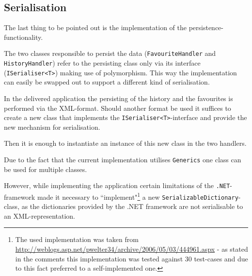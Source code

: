 \subsection{Serialisation}
\label{subsubsec:serialisation}

The last thing to be pointed out is the implementation of the persistence-functionality.

The two classes responsible to persist the data (\texttt{FavouriteHandler} and \texttt{HistoryHandler}) refer to the persisting class only via its interface (\texttt{ISerialiser<T>}) making use of polymorphism. This way the implementation can easily be swapped out to support a different kind of serialisation.

In the delivered application the persisting of the history and the favourites is performed via the \ac{XML}-format. Should another format be used it suffices to create a new class that implements the \texttt{ISerialiser<T>}-interface and provide the new mechanism for serialisation.

Then it is enough to instantiate an instance of this new class in the two handlers.

Due to the fact that the current implementation utilises \texttt{Generics} one class can be used for multiple classes.

However, while implementing the application certain limitations of the \texttt{.NET}-framework made it necessary to ``implement"\footnote{The used implementation was taken from \url{http://weblogs.asp.net/pwelter34/archive/2006/05/03/444961.aspx} - as stated in the comments this implementation was tested against 30 test-cases and due to this fact preferred to a self-implemented one.} a new \texttt{SerializableDictionary}-class, as the dictionaries provided by the .NET framework are not serialisable to an \ac{XML}-representation.
